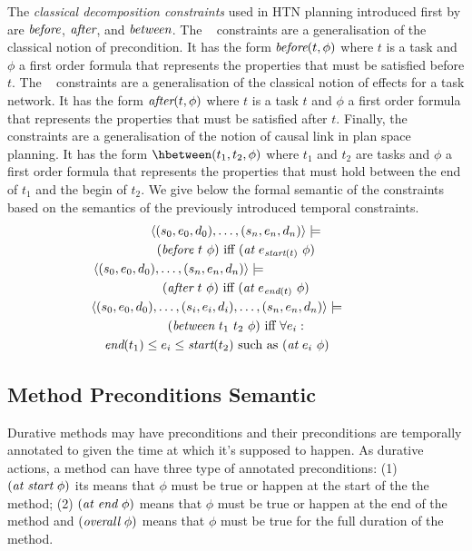 \documentclass[letterpaper]{article} %
\newcommand{\at}{\text{\it at}}
\newcommand{\before}{\text{\it before}}
\newcommand{\after}{\text{\it after}}
\renewcommand{\between}{\text{\it between}}
\newcommand{\atstart}{\text{\it at start}}
\newcommand{\atend}{\text{\it at end}}
\newcommand{\overall}{\text{\it overall}}
\newcommand{\tstart}{\text{\it start}}
\newcommand{\tend}{\text{\it end}}
\begin{document}
The {\em classical decomposition constraints} used in HTN planning introduced first by \citep{erol94} are $\before$, $\after$, and $\between$. The \before~ constraints are a generalisation of the classical notion of precondition. It has the form $\before(t, \phi)$ where $t$ is a task and $\phi$ a first order formula that represents the properties that must be satisfied before $t$. The \after~ constraints are a generalisation of the classical notion of effects  for a task network. It has the form $\after(t, \phi)$ where $t$ is a task $t$ and $\phi$ a first order formula that represents the properties that must be satisfied after $t$. Finally, the \between constraints are a generalisation of the notion of causal link in plan space planning. It has the form $\hbetween(t_1, t_2, \phi)$ where $t_1$ and $t_2$ are tasks and $\phi$ a first order formula that represents the properties that must hold between the end of $t_1$ and the begin of $t_2$. We give below the formal semantic of the constraints based on the semantics of the previously introduced temporal constraints.
\begin{multline*}
\langle (s_0, e_0, d_0), \ldots, (s_n, e_n, d_n) \rangle \models  \\
(\before \ t \ \phi) \  \text{iff} \ (\at \ e_{\tstart(t)} \ \phi) \\
\langle (s_0, e_0, d_0), \ldots, (s_n, e_n, d_n) \rangle \models  \qquad \qquad \qquad \qquad \quad\\
(\after \ t \ \phi) \  \text{iff} \ (\at \ e_{\tend(t)} \ \phi) \\
\langle (s_0, e_0, d_0), \ldots, (s_i, e_i, d_i), \ldots, (s_n, e_n, d_n) \rangle \models \qquad \quad \\
    (\between \ t_1 \ t_2 \ \phi) \ \text{iff} \ \forall e_i :  \\
\tend(t_1) \leq e_i \leq \tstart(t_2) \ \text{such as} \ (\at \ e_i \ \phi) \qquad \quad 
\end{multline*}

\subsection{Method Preconditions Semantic}

Durative methods may have preconditions and their preconditions are temporally annotated to given the time at which it’s supposed to happen. As durative actions, a method can have three type of annotated preconditions: (1) $(\atstart \ \phi)$ its means that $\phi$ must be true or happen at the start of the the method; (2) $(\atend \ \phi)$ means that $\phi$ must be true or happen at the end of the method and $(\overall \ \phi)$ means that $\phi$ must be true for the full duration of the method.
\end{document}
